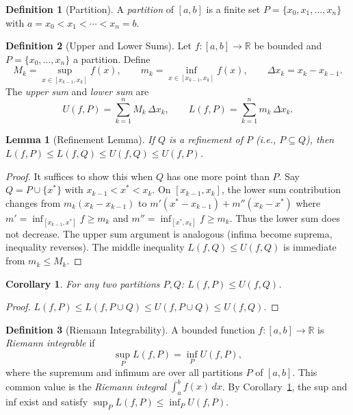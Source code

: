 \documentclass[11pt,a4paper]{article}
\theoremstyle{definition}
\newtheorem{definition}{Definition}[section]
\theoremstyle{plain}
\newtheorem{lemma}[theorem]{Lemma}
\newtheorem{corollary}[theorem]{Corollary}
\theoremstyle{remark}
\newcommand{\R}{\mathbb{R}}
\begin{document}
\begin{definition}[Partition]
\label{def:partition}
A \emph{partition} of $[a, b]$ is a finite set $P = \{x_0, x_1, \ldots, x_n\}$
with $a = x_0 < x_1 < \cdots < x_n = b$.
\end{definition}

\begin{definition}[Upper and Lower Sums]
\label{def:upper_lower_sums}
Let $f : [a, b] \to \R$ be bounded and $P = \{x_0, \ldots, x_n\}$ a partition.
Define
\[
M_k = \sup_{x \in [x_{k-1}, x_k]} f(x), \qquad
m_k = \inf_{x \in [x_{k-1}, x_k]} f(x), \qquad
\Delta x_k = x_k - x_{k-1}.
\]
The \emph{upper sum} and \emph{lower sum} are
\[
U(f, P) = \sum_{k=1}^n M_k \,\Delta x_k, \qquad
L(f, P) = \sum_{k=1}^n m_k \,\Delta x_k.
\]
\end{definition}

\begin{lemma}[Refinement Lemma]
\label{lem:refinement}
If $Q$ is a refinement of $P$ (i.e., $P \subseteq Q$), then
$L(f, P) \le L(f, Q) \le U(f, Q) \le U(f, P)$.
\end{lemma}

\begin{proof}
It suffices to show this when $Q$ has one more point than $P$. Say
$Q = P \cup \{x^*\}$ with $x_{k-1} < x^* < x_k$. On $[x_{k-1}, x_k]$,
the lower sum contribution changes from $m_k(x_k - x_{k-1})$ to
$m'(x^* - x_{k-1}) + m''(x_k - x^*)$ where
$m' = \inf_{[x_{k-1}, x^*]} f \ge m_k$ and
$m'' = \inf_{[x^*, x_k]} f \ge m_k$. Thus the lower sum does not decrease.
The upper sum argument is analogous (infima become suprema, inequality reverses).
The middle inequality $L(f, Q) \le U(f, Q)$ is immediate from $m_k \le M_k$.
\end{proof}

\begin{corollary}
\label{cor:lower_le_upper}
For any two partitions $P, Q$: $L(f, P) \le U(f, Q)$.
\end{corollary}

\begin{proof}
$L(f, P) \le L(f, P \cup Q) \le U(f, P \cup Q) \le U(f, Q)$.
\end{proof}

\begin{definition}[Riemann Integrability]
\label{def:riemann_int}
A bounded function $f : [a, b] \to \R$ is \emph{Riemann integrable} if
\[
\sup_P L(f, P) = \inf_P U(f, P),
\]
where the supremum and infimum are over all partitions $P$ of $[a, b]$.
This common value is the \emph{Riemann integral} $\int_a^b f(x)\,dx$.
By Corollary~\ref{cor:lower_le_upper}, the sup and inf exist and satisfy
$\sup_P L(f,P) \le \inf_P U(f,P)$.
\end{definition}
\end{document}
